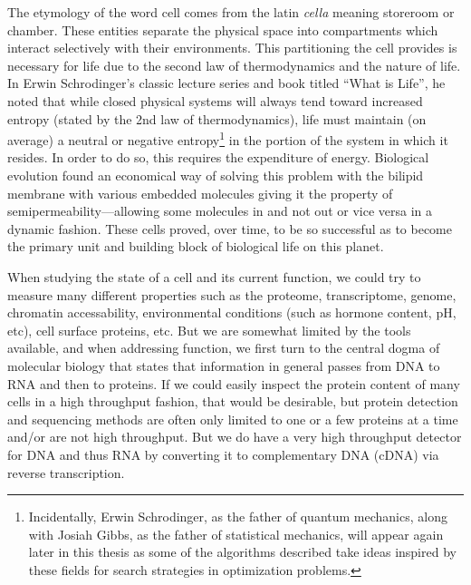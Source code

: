 \par{
The etymology of the word cell comes from the latin \textit{cella} meaning storeroom or chamber. These entities separate the physical space into compartments which interact selectively with their environments. This partitioning the cell provides is necessary for life due to the second law of thermodynamics and the nature of life. In Erwin Schrodinger's classic lecture series and book titled ``What is Life''\cite{whatislife}, he noted that while closed physical systems will always tend toward increased entropy (stated by the 2nd law of thermodynamics\cite{thermodynamics1}\cite{thermodynamics2}\cite{maxwell}), life must maintain (on average) a neutral or negative entropy\footnote{Incidentally, Erwin Schrodinger, as the father of quantum mechanics, along with Josiah Gibbs, as the father of statistical mechanics, will appear again later in this thesis as some of the algorithms described take ideas inspired by these fields for search strategies in optimization problems.} in the portion of the system in which it resides\cite{informationtheorylife}\cite{astrobiology}\cite{extremalities}. In order to do so, this requires the expenditure of energy. Biological evolution found an economical way of solving this problem with the bilipid membrane with various embedded molecules giving it the property of semipermeability---allowing some molecules in and not out or vice versa in a dynamic fashion. These cells proved, over time, to be so successful as to become the primary unit and building block of biological life on this planet. 
} 

\par{
When studying the state of a cell and its current function, we could try to measure many different properties such as the proteome, transcriptome, genome, chromatin accessability, environmental conditions (such as hormone content, pH, etc), cell surface proteins, etc. But we are somewhat limited by the tools available, and when addressing function, we first turn to the central dogma of molecular biology\cite{centraldogma} that states that information in general passes from DNA to RNA and then to proteins. If we could easily inspect the protein content of many cells in a high throughput fashion, that would be desirable, but protein detection and sequencing methods are often only limited to one or a few proteins at a time and/or are not high throughput\cite{immunohistochemistry}\cite{multiIHC}\cite{westernblot}\cite{western2}\cite{multimassspec}\cite{ionbeam}\cite{cellIHC}\cite{proteinsequencing}. But we do have a very high throughput detector for DNA and thus RNA by converting it to complementary DNA (cDNA) via reverse transcription.
}

